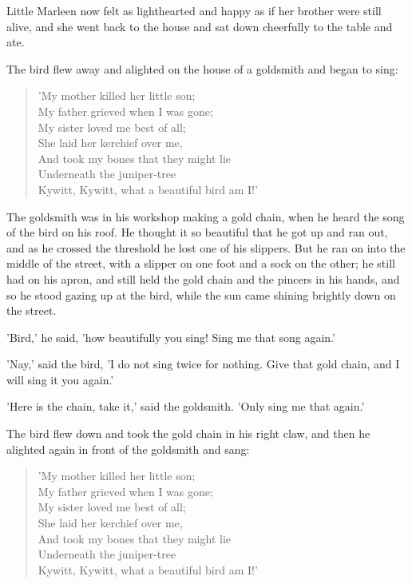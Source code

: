 \documentclass[12pt]{book}
\begin{document}
Little Marleen now felt as lighthearted and happy as if her brother
were still alive, and she went back to the house and sat down
cheerfully to the table and ate.

The bird flew away and alighted on the house of a goldsmith and began
to sing:

\begin{verse}
 'My mother killed her little son;\\
  My father grieved when I was gone;\\
  My sister loved me best of all;\\
  She laid her kerchief over me,\\
  And took my bones that they might lie\\
  Underneath the juniper-tree\\
  Kywitt, Kywitt, what a beautiful bird am I!'
\end{verse}

The goldsmith was in his workshop making a gold chain, when he heard
the song of the bird on his roof. He thought it so beautiful that he
got up and ran out, and as he crossed the threshold he lost one of his
slippers. But he ran on into the middle of the street, with a slipper
on one foot and a sock on the other; he still had on his apron, and
still held the gold chain and the pincers in his hands, and so he
stood gazing up at the bird, while the sun came shining brightly down
on the street.

'Bird,' he said, 'how beautifully you sing! Sing me that song again.'

'Nay,' said the bird, 'I do not sing twice for nothing. Give that gold
chain, and I will sing it you again.'

'Here is the chain, take it,' said the goldsmith. 'Only sing me that
again.'

The bird flew down and took the gold chain in his right claw, and then
he alighted again in front of the goldsmith and sang:

\begin{verse}
 'My mother killed her little son;\\
  My father grieved when I was gone;\\
  My sister loved me best of all;\\
  She laid her kerchief over me,\\
  And took my bones that they might lie\\
  Underneath the juniper-tree\\
  Kywitt, Kywitt, what a beautiful bird am I!'
\end{verse}
\end{document}
